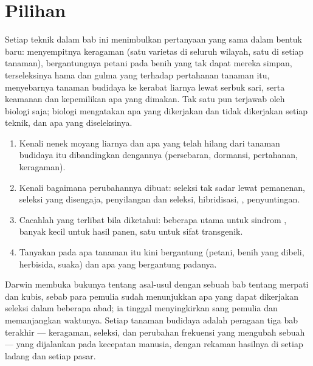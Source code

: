 \section{Pilihan}

\begin{proposition}\label{prop:g12:domesticated-plants:stakes}
Setiap teknik dalam bab ini menimbulkan pertanyaan yang sama dalam
bentuk baru: menyempitnya keragaman (satu varietas di seluruh wilayah,
satu  di setiap tanaman), bergantungnya petani pada benih yang tak
dapat mereka simpan, terseleksinya hama dan gulma yang  terhadap
pertahanan tanaman itu, menyebarnya  tanaman budidaya ke kerabat
liarnya lewat serbuk sari, serta keamanan dan kepemilikan apa yang
dimakan. Tak satu pun terjawab oleh biologi saja; biologi mengatakan
apa yang dikerjakan dan tidak dikerjakan setiap teknik, dan apa yang
diseleksinya.
\end{proposition}
\admitted

\begin{method}\label{met:g12:domesticated-plants:read}
\begin{enumerate}
  \item Kenali nenek moyang liarnya dan apa yang telah hilang dari
        tanaman budidaya itu dibandingkan dengannya (persebaran,
        dormansi, pertahanan, keragaman).
  \item Kenali bagaimana perubahannya dibuat: seleksi tak sadar lewat
        pemanenan, seleksi yang disengaja, penyilangan dan seleksi,
        hibridisasi, , penyuntingan.
  \item Cacahlah  yang terlibat bila diketahui: beberapa  utama
        untuk sindrom , banyak  kecil untuk hasil panen,
        satu  untuk sifat transgenik.
  \item Tanyakan pada apa tanaman itu kini bergantung (petani, benih
        yang dibeli, herbisida, suaka) dan apa yang bergantung padanya.
\end{enumerate}
\end{method}

\begin{remark}\label{rem:g12:domesticated-plants:oldest}
Darwin membuka bukunya tentang asal-usul  dengan sebuah bab
tentang merpati dan kubis, sebab para pemulia sudah menunjukkan apa
yang dapat dikerjakan seleksi dalam beberapa abad; ia tinggal
menyingkirkan sang pemulia dan memanjangkan waktunya. Setiap tanaman
budidaya adalah peragaan tiga bab terakhir --- keragaman, seleksi, dan
perubahan frekuensi yang mengubah sebuah  --- yang dijalankan
pada kecepatan manusia, dengan rekaman hasilnya di setiap ladang dan
setiap pasar.
\end{remark}


